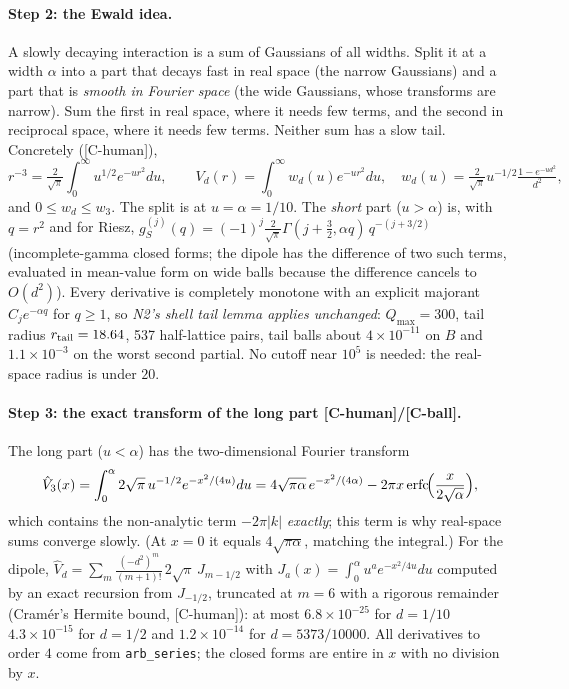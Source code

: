 \documentclass[11pt]{article}
\newcommand{\tier}[1]{\textsf{[#1]}}
\newcommand{\tCb}{\tier{C-ball}}
\newcommand{\tCh}{\tier{C-human}}
\begin{document}
\paragraph{Step 2: the Ewald idea.} A slowly decaying interaction is a sum of Gaussians of all widths. Split it at a width $\alpha$ into a part that decays fast in real space (the narrow Gaussians) and a part that is \emph{smooth in Fourier space} (the wide Gaussians, whose transforms are narrow). Sum the first in real space, where it needs few terms, and the second in reciprocal space, where it needs few terms. Neither sum has a slow tail. Concretely (\tCh),
\[r^{-3}=\tfrac{2}{\sqrt\pi}\int_0^\infty u^{1/2}e^{-ur^2}du,\qquad V_d(r)=\int_0^\infty w_d(u)e^{-ur^2}du,\quad w_d(u)=\tfrac{2}{\sqrt\pi}u^{-1/2}\tfrac{1-e^{-ud^2}}{d^2},\]
and $0\le w_d\le w_3$. The split is at $u=\alpha=1/10$. The \emph{short} part ($u>\alpha$) is, with $q=r^2$ and for Riesz,
$g_S^{(j)}(q)=(-1)^j\tfrac{2}{\sqrt\pi}\Gamma(j+\tfrac32,\alpha q)\,q^{-(j+3/2)}$ (incomplete-gamma closed forms; the dipole has the difference of two such terms, evaluated in mean-value form on wide balls because the difference cancels to $O(d^2)$). Every derivative is completely monotone with an explicit majorant $C_je^{-\alpha q}$ for $q\ge1$, so \emph{N2's shell tail lemma applies unchanged}: $Q_{\max}=300$, tail radius $r_{\rm tail}=18.64$, 537 half-lattice pairs, tail balls about $4\times10^{-11}$ on $B$ and $1.1\times10^{-3}$ on the worst second partial. No cutoff near $10^5$ is needed: the real-space radius is under $20$.

\paragraph{Step 3: the exact transform of the long part \tCh/\tCb.} The long part ($u<\alpha$) has the two-dimensional Fourier transform
\[\hat V_3(x)=\int_0^\alpha 2\sqrt\pi\,u^{-1/2}e^{-x^2/(4u)}du=4\sqrt{\pi\alpha}\,e^{-x^2/(4\alpha)}-2\pi x\,\mathrm{erfc}\!\Bigl(\frac{x}{2\sqrt\alpha}\Bigr),\]
which contains the non-analytic term $-2\pi|k|$ \emph{exactly}; this term is why real-space sums converge slowly. (At $x=0$ it equals $4\sqrt{\pi\alpha}$, matching the integral.) For the dipole, $\hat V_d=\sum_m\tfrac{(-d^2)^m}{(m+1)!}\,2\sqrt\pi\,J_{m-1/2}$ with $J_a(x)=\int_0^\alpha u^ae^{-x^2/4u}du$ computed by an exact recursion from $J_{-1/2}$, truncated at $m=6$ with a rigorous remainder (Cram\'er's Hermite bound, \tCh): at most $6.8\times10^{-25}$ for $d=1/10$ $4.3\times10^{-15}$ for $d=1/2$ and $1.2\times10^{-14}$ for $d=5373/10000$. All derivatives to order $4$ come from \texttt{arb\_series}; the closed forms are entire in $x$ with no division by $x$.
\end{document}
